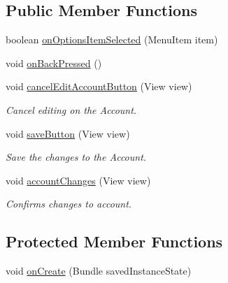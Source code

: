 \subsection*{Public Member Functions}
\begin{DoxyCompactItemize}
\item 
boolean \hyperlink{classuk_1_1ac_1_1swan_1_1digitaltrails_1_1activities_1_1_edit_account_activity_ab9e5381f1b92ab13f0fdf108eb88ff63}{on\+Options\+Item\+Selected} (Menu\+Item item)
\item 
void \hyperlink{classuk_1_1ac_1_1swan_1_1digitaltrails_1_1activities_1_1_edit_account_activity_a75e35c7439f488a74410b8d96368a3db}{on\+Back\+Pressed} ()
\item 
void \hyperlink{classuk_1_1ac_1_1swan_1_1digitaltrails_1_1activities_1_1_edit_account_activity_af09e26ec9bceb07fc92b2a671520e8eb}{cancel\+Edit\+Account\+Button} (View view)
\begin{DoxyCompactList}\small\item\em Cancel editing on the Account. \end{DoxyCompactList}\item 
void \hyperlink{classuk_1_1ac_1_1swan_1_1digitaltrails_1_1activities_1_1_edit_account_activity_a0246e502541ecb8e02f82a78f33f76d2}{save\+Button} (View view)
\begin{DoxyCompactList}\small\item\em Save the changes to the Account. \end{DoxyCompactList}\item 
void \hyperlink{classuk_1_1ac_1_1swan_1_1digitaltrails_1_1activities_1_1_edit_account_activity_a92b3451646d7405ac6940aa5fe9a4f60}{account\+Changes} (View view)
\begin{DoxyCompactList}\small\item\em Confirms changes to account. \end{DoxyCompactList}\end{DoxyCompactItemize}
\subsection*{Protected Member Functions}
\begin{DoxyCompactItemize}
\item 
void \hyperlink{classuk_1_1ac_1_1swan_1_1digitaltrails_1_1activities_1_1_edit_account_activity_a2970ec58e5f371186368faad266111f7}{on\+Create} (Bundle saved\+Instance\+State)
\end{DoxyCompactItemize}


